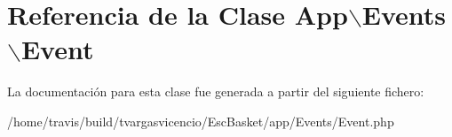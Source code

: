 \hypertarget{class_app_1_1_events_1_1_event}{\section{\-Referencia de la \-Clase \-App$\backslash$\-Events$\backslash$\-Event}
\label{class_app_1_1_events_1_1_event}
}


\-La documentación para esta clase fue generada a partir del siguiente fichero\-:\begin{DoxyCompactItemize}
\item 
/home/travis/build/tvargasvicencio/\-Esc\-Basket/app/\-Events/\-Event.\-php\end{DoxyCompactItemize}
